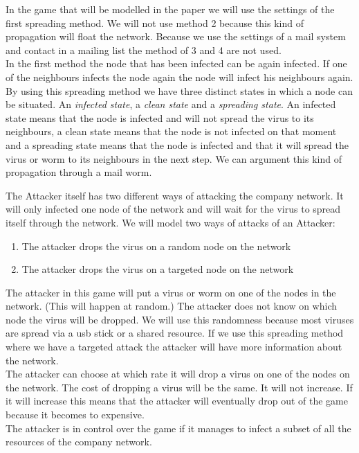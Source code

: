In the game that will be modelled in the paper we will use the settings of the first spreading method. We will not use method 2 because this kind of propagation will float the network. Because we use the settings of a mail system and contact in a mailing list the method of 3 and 4 are not used. \\
In the first method the node that has been infected can be again infected. If one of the neighbours infects the node again the node will infect his neighbours again. By using this spreading method we have three distinct states in which a node can be situated. An \textit{infected state}, a \textit{clean state} and a \textit{spreading state}. An infected state means that the node is infected and will not spread the virus to its neighbours, a clean state means that the node is not infected on that moment and a spreading state means that the node is infected and that it will spread the virus or worm to its neighbours in the next step.
We can argument this kind of propagation through a mail worm. 

The Attacker itself has two different ways of attacking the company network. It will only infected one node of the network and will wait for the virus to spread itself through the network. We will model two ways of attacks of an Attacker:
\begin{enumerate}
\item The attacker drops the virus on a random node on the network
\item The attacker drops the virus on a targeted node on the network
\end{enumerate}
The attacker in this game will put a virus or worm on one of the nodes in the network. (This will happen at random.) The attacker does not know on which node the virus will be dropped. We will use this randomness because  most viruses are spread via a usb stick or a shared resource. If we use this spreading method where we have a targeted attack the attacker will have more information about the network. \\

The attacker can choose at which rate it will drop a virus on one of the nodes on the network. The cost of dropping a virus will be the same. It will not increase. If it will increase this means that the attacker will eventually drop out of the game because it becomes to expensive.\\
The attacker is in control over the game if it manages to infect a subset of all the resources of the company network.


